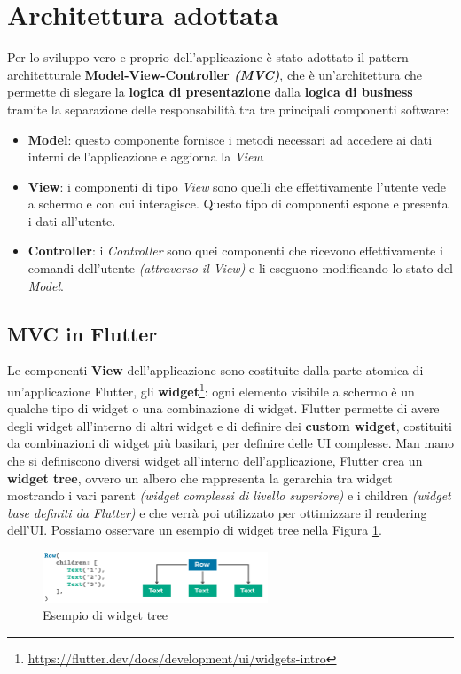 \newpage

\section{Architettura adottata}
Per lo sviluppo vero e proprio dell'applicazione è stato adottato il pattern architetturale \textbf{Model-View-Controller \textit{(MVC)}}\cite{MVC}, che è un'architettura che permette di slegare la \textbf{logica di presentazione} dalla \textbf{logica di business} tramite la separazione delle responsabilità tra tre principali componenti software:
\begin{itemize}
\item \textbf{Model}: questo componente fornisce i metodi necessari ad accedere ai dati interni dell'applicazione e aggiorna la \textit{View}.
\item \textbf{View}: i componenti di tipo \textit{View} sono quelli che effettivamente l'utente vede a schermo e con cui interagisce. Questo tipo di componenti espone e presenta i dati all'utente.
\item \textbf{Controller}: i \textit{Controller} sono quei componenti che ricevono effettivamente i comandi dell'utente \textit{(attraverso il View)} e li eseguono modificando lo stato del \textit{Model}.
\end{itemize}

\subsection{MVC in Flutter}
Le componenti \textbf{View} dell'applicazione sono costituite dalla parte atomica di un'applicazione Flutter, gli \textbf{widget}\footnote{\url{https://flutter.dev/docs/development/ui/widgets-intro}}: ogni elemento visibile a schermo è un qualche tipo di widget o una combinazione di widget. Flutter permette di avere degli widget all'interno di altri widget e di definire dei \textbf{custom widget}, costituiti da combinazioni di widget più basilari, per definire delle UI complesse. Man mano che si definiscono diversi widget all'interno dell'applicazione, Flutter crea un \textbf{widget tree}, ovvero un albero che rappresenta la gerarchia tra widget mostrando i vari parent \textit{(widget complessi di livello superiore)} e i children \textit{(widget base definiti da Flutter)} e che verrà poi utilizzato per ottimizzare il rendering dell'UI.
Possiamo osservare un esempio di widget tree nella Figura \ref{fig:widget_tree}.

\begin{figure}[h]
\centering
\includegraphics[width=0.6\textwidth]{img/widget_tree}
\caption{Esempio di widget tree}
\label{fig:widget_tree}
\end{figure}

